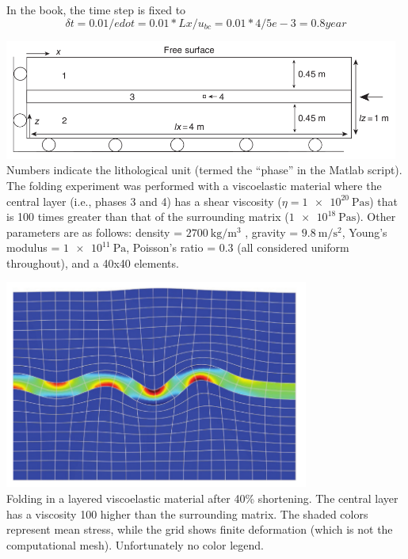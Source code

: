 In the book, the time step is fixed to 
\[
\delta t = 0.01/edot = 0.01*Lx/u_{bc} = 0.01*4/5e-3 = 0.8year
\]

\begin{center}
\includegraphics[width=13cm]{python_codes/fieldstone_129/images/simpson1}\\
{\captionfont  
Numbers indicate the lithological unit (termed the ``phase'' in the Matlab script). 
The folding experiment was
performed with a viscoelastic material where the central layer (i.e., phases 3 and 4) 
has a shear viscosity ($\eta=\SI{1e20}{\pascal\second}$) that
is 100 times greater than that of the surrounding matrix ($\SI{1e18}{\pascal\second}$). 
Other parameters are as follows: 
density = $\SI{2700}{\kg\per\cubic\meter}$ , 
gravity = $\SI{9.8}{\meter\per\square\second}$, 
Young's modulus = $\SI{1e11}{\pascal}$, 
Poisson’s ratio = 0.3 (all considered uniform throughout),
and a 40x40 elements.}
\end{center}


\begin{center}
\includegraphics[width=10cm]{python_codes/fieldstone_129/images/simpson2}\\
{\captionfont 
Folding in a layered viscoelastic material after 40\% shortening. The central layer has a viscosity 100
higher than the surrounding matrix. The shaded colors represent mean stress, 
while the grid shows finite deformation (which is not the computational mesh).
Unfortunately no color legend.}
\end{center}

